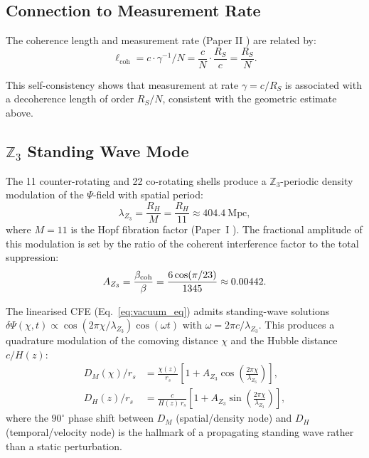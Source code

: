 \subsection{Connection to Measurement Rate}
\label{sec:measurement_rate}

The coherence length and measurement rate (Paper II \citep{Peacock2026b_qm}) are related by:
\begin{equation}
\ell_{\text{coh}} = c \cdot \gamma^{-1} / N = \frac{c}{N} \cdot \frac{R_S}{c} = \frac{R_S}{N}.
\end{equation}

This self-consistency shows that measurement at rate $\gamma = c/R_S$ is associated with a decoherence length of order $R_S/N$, consistent with the geometric estimate above.

\subsection{$\mathbb{Z}_3$ Standing Wave Mode}
\label{sec:z3_standing_wave}

The 11 counter-rotating and 22 co-rotating shells produce a $\mathbb{Z}_3$-periodic
density modulation of the $\Psi$-field with spatial period:
\begin{equation}
\lambda_{Z_3} = \frac{R_H}{M} = \frac{R_H}{11} \approx 404.4~\text{Mpc},
\label{eq:lambda_z3}
\end{equation}
where $M = 11$ is the Hopf fibration factor (Paper~I \citep{Peacock2026a}).
The fractional amplitude of this modulation is set by the ratio of the coherent
interference factor to the total suppression:
\begin{equation}
A_{Z_3} = \frac{\beta_{\rm coh}}{\beta} = \frac{6\cos(\pi/23)}{1345} \approx 0.00442.
\label{eq:A_z3}
\end{equation}

The linearised CFE (Eq.~\eqref{eq:vacuum_eq}) admits standing-wave solutions
$\delta\Psi(\chi, t) \propto \cos(2\pi\chi/\lambda_{Z_3})\cos(\omega t)$ with
$\omega = 2\pi c/\lambda_{Z_3}$.
This produces a quadrature modulation of the comoving distance $\chi$
and the Hubble distance $c/H(z)$:
\begin{align}
D_M(\chi)/r_s &= \frac{\chi(z)}{r_s}\left[1 + A_{Z_3}\cos\!\left(\frac{2\pi\chi}{\lambda_{Z_3}}\right)\right], \label{eq:DM_z3} \\
D_H(z)/r_s   &= \frac{c}{H(z)\,r_s}\left[1 + A_{Z_3}\sin\!\left(\frac{2\pi\chi}{\lambda_{Z_3}}\right)\right], \label{eq:DH_z3}
\end{align}
where the $90^\circ$ phase shift between $D_M$ (spatial/density node) and $D_H$ (temporal/velocity node)
is the hallmark of a propagating standing wave rather than a static perturbation.

